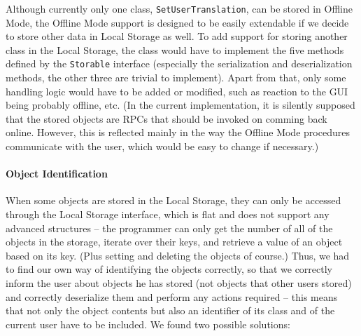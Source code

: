 Although currently only one class, {\tt SetUserTranslation}, can be stored in Offline Mode, the Offline Mode support is designed to be easily extendable if we decide to store other data in Local Storage as well.
To add support for storing another class in the Local Storage, the class would have to implement the five methods defined by the {\tt Storable} interface (especially the serialization and deserialization methods, the other three are trivial to implement). Apart from that, only some handling logic would have to be added or modified, such as reaction to the GUI being probably offline, etc.
(In the current implementation, it is silently supposed that the stored objects are RPCs that should be invoked on comming back online. However, this is reflected mainly in the way the Offline Mode procedures communicate with the user, which would be easy to change if necessary.)

\paragraph{Object Identification}
When some objects are stored in the Local Storage, they can only be accessed through the Local Storage interface, which is flat and does not support any advanced structures -- the programmer can only get the number of all of the objects in the storage, iterate over their keys, and retrieve a value of an object based on its key. (Plus setting and deleting the objects of course.)
Thus, we had to find our own way of identifying the objects correctly, so that we correctly inform the user about objects he has stored (not objects that other users stored) and correctly deserialize them and perform any actions required -- this means that not only the object contents but also an identifier of its class and of the current user have to be included. We found two possible solutions:

